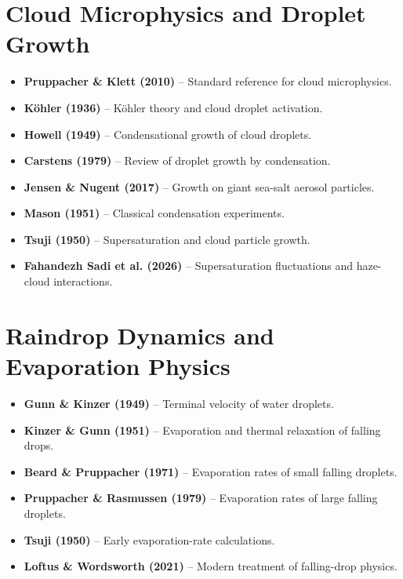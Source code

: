 \documentclass[11pt,a4paper]{article}
\begin{document}
\section{Cloud Microphysics and Droplet Growth}


\begin{itemize}
    \item \textbf{Pruppacher \& Klett (2010)} -- Standard reference for cloud microphysics.
    \item \textbf{Köhler (1936)} -- Köhler theory and cloud droplet activation.
    \item \textbf{Howell (1949)} -- Condensational growth of cloud droplets.
    \item \textbf{Carstens (1979)} -- Review of droplet growth by condensation.
    \item \textbf{Jensen \& Nugent (2017)} -- Growth on giant sea-salt aerosol particles.
    \item \textbf{Mason (1951)} -- Classical condensation experiments.
    \item \textbf{Tsuji (1950)} -- Supersaturation and cloud particle growth.
    \item \textbf{Fahandezh Sadi et al. (2026)} -- Supersaturation fluctuations and haze-cloud interactions.
\end{itemize}

\section{Raindrop Dynamics and Evaporation Physics}


\begin{itemize}
    \item \textbf{Gunn \& Kinzer (1949)} -- Terminal velocity of water droplets.
    \item \textbf{Kinzer \& Gunn (1951)} -- Evaporation and thermal relaxation of falling drops.
    \item \textbf{Beard \& Pruppacher (1971)} -- Evaporation rates of small falling droplets.
    \item \textbf{Pruppacher \& Rasmussen (1979)} -- Evaporation rates of large falling droplets.
    \item \textbf{Tsuji (1950)} -- Early evaporation-rate calculations.
    \item \textbf{Loftus \& Wordsworth (2021)} -- Modern treatment of falling-drop physics.
\end{itemize}
\end{document}
